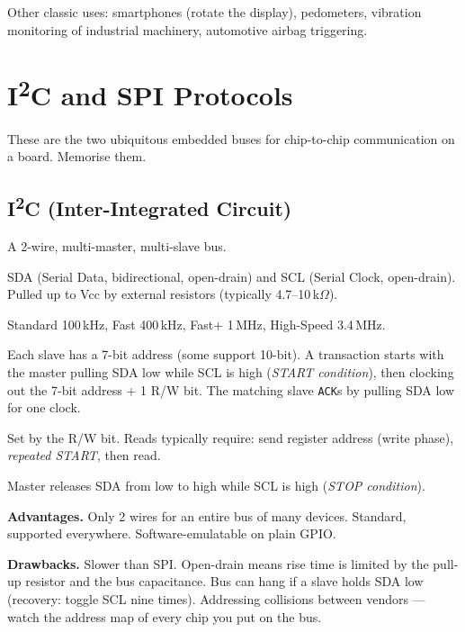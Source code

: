 \documentclass[11pt,a4paper]{article}
\begin{document}
Other classic uses: smartphones (rotate the display), pedometers,
vibration monitoring of industrial machinery, automotive airbag
triggering.

\section{I\textsuperscript{2}C and SPI Protocols}

These are the two ubiquitous embedded buses for chip-to-chip
communication on a board. Memorise them.

\subsection{I\textsuperscript{2}C (Inter-Integrated Circuit)}

A 2-wire, multi-master, multi-slave bus.

\begin{description}[leftmargin=*, style=nextline]
    \item[Wires] SDA (Serial Data, bidirectional, open-drain) and SCL
    (Serial Clock, open-drain). Pulled up to Vcc by external resistors
    (typically 4.7--10\,k$\Omega$).
    \item[Speeds] Standard 100\,kHz, Fast 400\,kHz, Fast+ 1\,MHz,
    High-Speed 3.4\,MHz.
    \item[Addressing] Each slave has a 7-bit address (some support 10-bit).
    A transaction starts with the master pulling SDA low while SCL is high
    (\emph{START condition}), then clocking out the 7-bit address + 1 R/W bit.
    The matching slave \texttt{ACK}s by pulling SDA low for one clock.
    \item[Direction] Set by the R/W bit. Reads typically require: send
    register address (write phase), \emph{repeated START}, then read.
    \item[Stop] Master releases SDA from low to high while SCL is high
    (\emph{STOP condition}).
\end{description}

\textbf{Advantages.} Only 2 wires for an entire bus of many devices.
Standard, supported everywhere. Software-emulatable on plain GPIO.

\textbf{Drawbacks.} Slower than SPI. Open-drain means rise time is limited
by the pull-up resistor and the bus capacitance. Bus can hang if a slave
holds SDA low (recovery: toggle SCL nine times). Addressing collisions
between vendors --- watch the address map of every chip you put on the bus.
\end{document}
